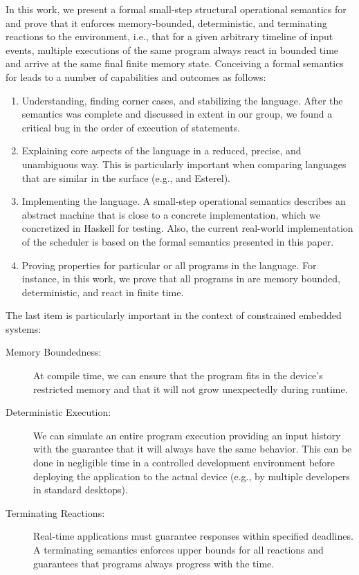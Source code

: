 In this work, we present a formal small-step structural operational
semantics for \CEU and prove that it enforces memory-bounded, deterministic,
and terminating reactions to the environment, i.e., that for a given
arbitrary timeline of input events, multiple executions of the same program
always react in bounded time and arrive at the same final finite memory
state.
%
Conceiving a formal semantics for \CEU leads to a number of capabilities and
outcomes as follows:

\begin{enumerate}
\item
    Understanding, finding corner cases, and stabilizing the language.
    After the semantics was complete and discussed in extent in our group, we
    found a critical bug in the order of execution of statements.
\item
    Explaining core aspects of the language in a reduced, precise, and
    unambiguous way.
    This is particularly important when comparing languages that are similar in
    the surface (e.g., \CEU and Esterel).
\item
    Implementing the language.
    A small-step operational semantics describes an abstract machine that is
    close to a concrete implementation, which we concretized in Haskell for
    testing.
    Also, the current real-world implementation of the \CEU scheduler is based
    on the formal semantics presented in this paper.
\item
    Proving properties for particular or all programs in the language.
    For instance, in this work, we prove that all programs in \CEU are memory
    bounded, deterministic, and react in finite time.
\end{enumerate}

The last item is particularly important in the context of constrained embedded
systems:

\begin{description}
\item[Memory Boundedness:]
At compile time, we can ensure that the program fits in the device's restricted
memory and that it will not grow unexpectedly during runtime.
\item[Deterministic Execution:]
We can simulate an entire program execution providing an input history with the
guarantee that it will always have the same behavior.
This can be done in negligible time in a controlled development environment
before deploying the application to the actual device (e.g., by multiple
developers in standard desktops).
\item[Terminating Reactions:]
Real-time applications must guarantee responses within specified deadlines.
A terminating semantics enforces upper bounds for all reactions and guarantees
that programs always progress with the time.
\end{description}

